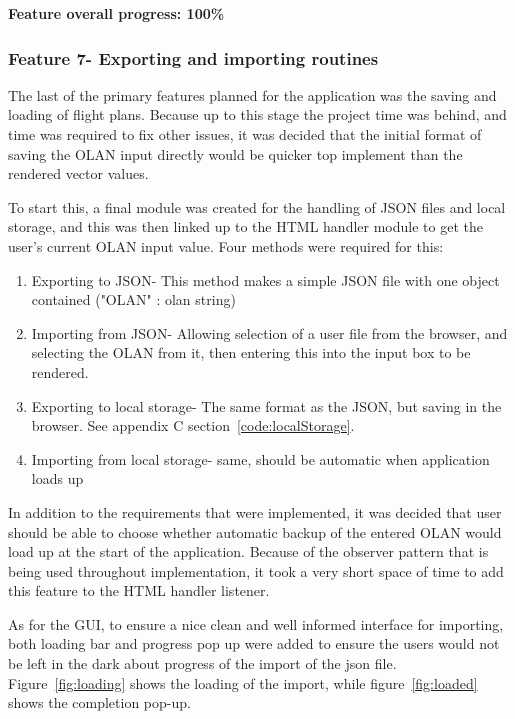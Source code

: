 \textbf{Feature overall progress: 100\%}

\subsubsection{Feature 7- Exporting and importing routines}
The last of the primary features planned for the application was the saving and loading of flight plans. Because up to this stage the project time was behind, and time was required to fix other issues, it was decided that the initial format of saving the OLAN input directly would be quicker top implement than the rendered vector values. 

To start this, a final module was created for the handling of JSON files and local storage, and this was then linked up to the HTML handler module to get the user's current OLAN input value. Four methods were required for this:
\begin{enumerate}
	\item Exporting to JSON- This method makes a simple JSON file with one object contained ("OLAN" : olan string)
	\item Importing from JSON- Allowing selection of a user file from the browser, and selecting the OLAN from it, then entering this into the input box to be rendered.
	\item Exporting to local storage- The same format as the JSON, but saving in the browser. See appendix C section~\ref{code:localStorage}.
	\item Importing from local storage- same, should be automatic when application loads up
\end{enumerate}

In addition to the requirements that were implemented, it was decided that user should be able to choose whether automatic backup of the entered OLAN would load up at the start of the application. Because of the observer pattern that is being used throughout implementation, it took a very short space of time to add this feature to the HTML handler listener. 

As for the GUI, to ensure a nice clean and well informed interface for importing, both loading bar and progress pop up were added to ensure the users would not be left in the dark about progress of the import of the json file. Figure~\ref{fig:loading} shows the loading of the import, while figure~\ref{fig:loaded} shows the completion pop-up.

